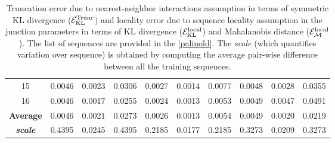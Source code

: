 \begin{table}[H]
\begin{center}
\begin{small}
\begin{tabular}{ c || c c c | c c c | c c c}
15  & 0.0046 &  0.0023  &  0.0306  & 0.0027 &  0.0014  &  0.0077  & 0.0048 &  0.0028  &  0.0355 \\
16  & 0.0046 &  0.0017  &  0.0255  & 0.0024 &  0.0013  &  0.0053  & 0.0049 &  0.0047  &  0.0491 \\
\hline
\textbf{Average} & 0.0046 & 0.0021  &  0.0273  & 0.0026 & 0.0013  &  0.0054  & 0.0049 &  0.0020  &  0.0219 \\
\hline
\hline
\textbf{\textit{scale}}  & 0.4395 & 0.0245  &  0.4395 & 0.2185 & 0.0177  & 0.2185 & 0.3273 &  0.0209  &  0.3273 \\
\hline
\end{tabular}
\end{small}
\end{center}
\centering\caption{Truncation error due to nearest-neighbor interactions assumption in terms of symmetric KL divergence (${\mathcal E}_{\text{KL}}^{\text{Trunc}}$) and locality error due to sequence locality assumption in the junction parameters in terms of KL divergence (${\mathcal E}_{\text{KL}}^{\text{local}}$) and Mahalanobis distance (${\mathcal E}_{\mathcal{M}}^{\text{local}}$). The list of sequences are provided in the \cref{palinold}. The \textit{scale} (which quantifies variation over sequence) is obtained by computing the average pair-wise difference between all the training sequences.
}
\label{c4:tab3_errors}
\end{table}\clearpage


